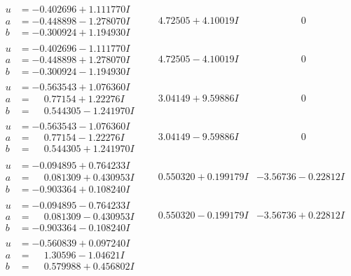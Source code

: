 \documentclass[1p]{elsarticle_modified}
\theoremstyle{definition}
\begin{document}
$$\begin{array}{c|c|c}
\begin{aligned}
u &= -0.402696 + 1.111770 I \\
a &= -0.448898 - 1.278070 I \\
b &= -0.300924 + 1.194930 I\end{aligned}
 & \phantom{-}4.72505 + 4.10019 I & \phantom{-0.000000 } 0 \\ \hline\begin{aligned}
u &= -0.402696 - 1.111770 I \\
a &= -0.448898 + 1.278070 I \\
b &= -0.300924 - 1.194930 I\end{aligned}
 & \phantom{-}4.72505 - 4.10019 I & \phantom{-0.000000 } 0 \\ \hline\begin{aligned}
u &= -0.563543 + 1.076360 I \\
a &= \phantom{-}0.77154 + 1.22276 I \\
b &= \phantom{-}0.544305 - 1.241970 I\end{aligned}
 & \phantom{-}3.04149 + 9.59886 I & \phantom{-0.000000 } 0 \\ \hline\begin{aligned}
u &= -0.563543 - 1.076360 I \\
a &= \phantom{-}0.77154 - 1.22276 I \\
b &= \phantom{-}0.544305 + 1.241970 I\end{aligned}
 & \phantom{-}3.04149 - 9.59886 I & \phantom{-0.000000 } 0 \\ \hline\begin{aligned}
u &= -0.094895 + 0.764233 I \\
a &= \phantom{-}0.081309 + 0.430953 I \\
b &= -0.903364 + 0.108240 I\end{aligned}
 & \phantom{-}0.550320 + 0.199179 I & -3.56736 - 0.22812 I \\ \hline\begin{aligned}
u &= -0.094895 - 0.764233 I \\
a &= \phantom{-}0.081309 - 0.430953 I \\
b &= -0.903364 - 0.108240 I\end{aligned}
 & \phantom{-}0.550320 - 0.199179 I & -3.56736 + 0.22812 I \\ \hline\begin{aligned}
u &= -0.560839 + 0.097240 I \\
a &= \phantom{-}1.30596 - 1.04621 I \\
b &= \phantom{-}0.579988 + 0.456802 I\end{aligned}

\end{array}$$
\end{document}
